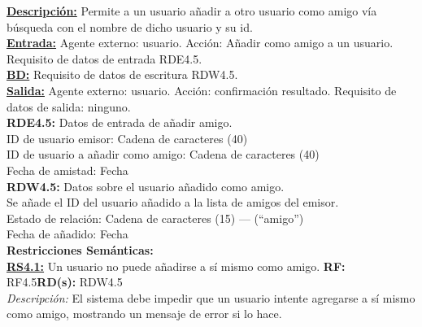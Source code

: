 \textbf{\textcolor{rojo}{\underline{Descripción:}}} Permite a un usuario añadir a otro usuario como amigo vía búsqueda con el nombre de dicho usuario y su id. \\[6pt]

\textbf{\textcolor{rojo}{\underline{Entrada:}}} Agente externo: usuario. Acción: Añadir como amigo a un usuario.
Requisito de datos de entrada \textcolor{azul}{RDE4.5}. \\[6pt]

\textbf{\textcolor{rojo}{\underline{BD:}}} Requisito de datos de escritura \textcolor{azul}{RDW4.5}.\\[6pt]

\textbf{\textcolor{rojo}{\underline{Salida:}}} Agente externo: usuario. Acción: confirmación resultado.
Requisito de datos de salida: ninguno.\\[12pt]


\textcolor{azul}{\textbf{RDE4.5:}} Datos de entrada de añadir amigo. \\[4pt]
\hspace*{1cm} ID de usuario emisor: Cadena de caracteres (40)\\
\hspace*{1cm} ID de usuario a añadir como amigo: Cadena de caracteres (40)\\
\hspace*{1cm} Fecha de amistad: Fecha\\[8pt]

\textcolor{azul}{\textbf{RDW4.5:}} Datos sobre el usuario añadido como amigo. \\[4pt]
\hspace*{1cm} Se añade el ID del usuario añadido a la lista de amigos del emisor.\\
\hspace*{1cm} Estado de relación: Cadena de caracteres (15) — (“amigo”)\\
\hspace*{1cm} Fecha de añadido: Fecha\\[8pt]

\textbf{\textcolor{verde}{Restricciones Semánticas:}} \\[6pt]

\textbf{\textcolor{verde}{\underline{RS4.1:}}} Un usuario no puede añadirse a sí mismo como amigo. \textbf{RF:} RF4.5\textbf{RD(s):} RDW4.5 \\ 
\hspace*{1cm} \textit{Descripción:} El sistema debe impedir que un usuario intente agregarse a sí mismo como amigo, mostrando un mensaje de error si lo hace. \\[4pt]

